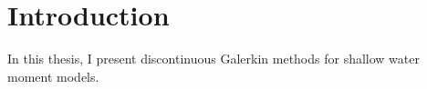 \chapter{Introduction}

In this thesis, I present discontinuous Galerkin methods for shallow water moment
models.




%
%


%
%
